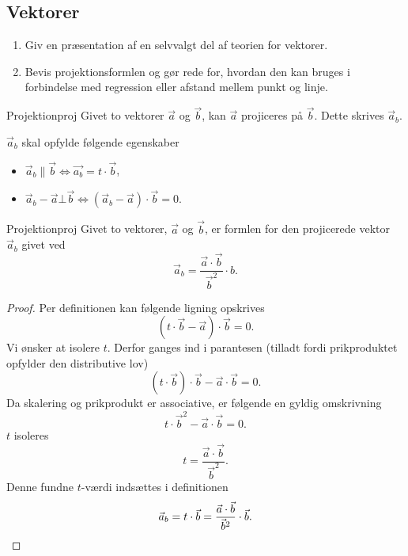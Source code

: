 \documentclass{article}
\begin{document}
\begin{tcolorbox}
	\section{Vektorer}
	\tcblower
	\begin{enumerate}
		\item Giv en præsentation af en selvvalgt del af teorien for vektorer.
		\item Bevis projektionsformlen og gør rede for, hvordan den kan bruges
			i forbindelse med regression eller afstand mellem punkt og linje.
	\end{enumerate}
\end{tcolorbox}

\begin{definition}{Projektion}{proj}
	Givet to vektorer $\vec{a}$ og $\vec{b}$, kan $\vec{a}$ projiceres på
	$\vec{b}$. Dette skrives $\vec{a}_b$.

	$\vec{a}_b$ skal opfylde følgende egenskaber
	\begin{itemize}
		\item $\vec{a}_b \parallel \vec{b} \iff \vec{a_b} = t \cdot \vec{b}$,
		\item $\vec{a}_b - \vec{a} \bot \vec{b} \iff (\vec{a}_b - \vec{a}) \cdot \vec{b} = 0$.
	\end{itemize}
\end{definition}

\begin{theorem}{Projektion}{proj}
	Givet to vektorer, $\vec{a}$ og $\vec{b}$, er formlen for den projicerede
	vektor $\vec{a}_b$ givet ved 
	\[
		\vec{a}_b = \frac{\vec{a} \cdot \vec{b}}{\vec{b}^2} \cdot b.
	\] 
\end{theorem}

\begin{proof}
Per definitionen kan følgende ligning opskrives
\[
	(t \cdot \vec{b} - \vec{a}) \cdot \vec{b} = 0.
\] 
Vi ønsker at isolere $t$. Derfor ganges ind i parantesen (tilladt fordi
prikproduktet opfylder den distributive lov)
\[
	(t \cdot \vec{b}) \cdot \vec{b} - \vec{a} \cdot \vec{b} = 0.
\] 
Da skalering og prikprodukt er associative, er følgende en gyldig omskrivning
\[
	t \cdot \vec{b}^2 - \vec{a} \cdot \vec{b} = 0.
\] 
$t$ isoleres
\[
	t = \frac{\vec{a} \cdot \vec{b}}{\vec{b}^2}.
\] 
Denne fundne $t$-værdi indsættes i definitionen
\[
	\vec{a}_b = t \cdot \vec{b} = \frac{\vec{a} \cdot \vec{b}}{\vec{b}^2} \cdot \vec{b}.\qedhere
\] 
\end{proof}
\end{document}
